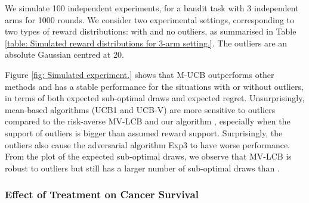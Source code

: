 We simulate 100 independent experiments, for a bandit task with 3 independent arms for
1000 rounds.
We consider two experimental settings, corresponding to two types of reward distributions:
with and no outliers, as summarised in
Table \ref{table: Simulated reward distributions for 3-arm setting.}.
The outliers are an absolute Gaussian centred at 20.

Figure \ref{fig: Simulated experiment.} shows that
M-UCB outperforms other methods
and has a stable performance for the situations with or without outliers,
in terms of both expected sub-optimal draws and expected regret.
Unsurprisingly, mean-based algorithms (UCB1 and UCB-V) are more sensitive to outliers
compared to the risk-averse MV-LCB and our algorithm \ourpolicy,
especially when the support of outliers is bigger than assumed reward support.
Surprisingly, the outliers also cause the adversarial algorithm Exp3 to have
worse performance. From the plot of the expected sub-optimal draws,
we observe that MV-LCB is robust to outliers but still has a larger number of sub-optimal
draws than \ourpolicy.





\subsubsection{Effect of Treatment on Cancer Survival}
\label{subsec: Real Data Experiments}

